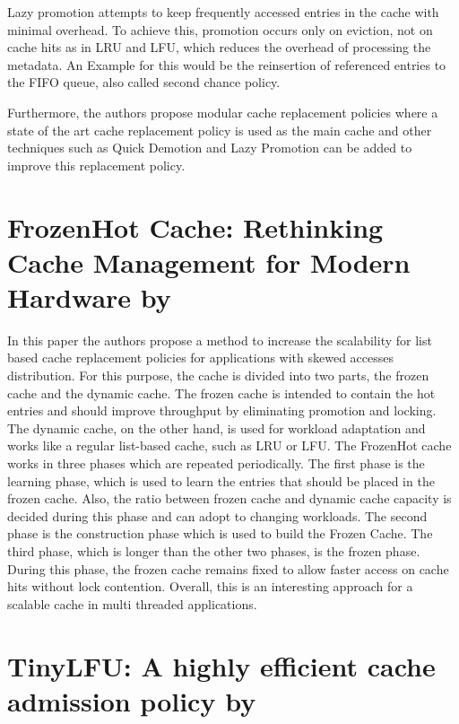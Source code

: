 \documentclass[
	12pt,
	a4paper,
	abstract,
	bibliography=totoc,
	chapterprefix,
	headings=openright,
	numbers=endperiod,
	parskip=half,
	twoside,
]{scrreprt}
\begin{document}
Lazy promotion attempts to keep frequently accessed entries in the cache with minimal overhead.
To achieve this, promotion occurs only on eviction, not on cache hits as in LRU and LFU, 
which reduces the overhead of processing the metadata.
An Example for this would be the reinsertion of referenced entries to the FIFO queue,
also called second chance policy.

Furthermore, the authors propose modular cache replacement policies where a state of the art cache replacement 
policy is used as the main cache and  other techniques such as Quick Demotion and Lazy Promotion 
can be added to improve this replacement policy.

\section*{FrozenHot Cache: Rethinking Cache Management for Modern Hardware by \cite{qiu2023frozenhot}}

In this paper the authors propose a method to increase the 
scalability for list based cache replacement policies for applications with skewed accesses distribution.
For this purpose, the cache is divided into two parts, the frozen cache and the dynamic cache.
The frozen cache is intended to contain the hot entries and should improve throughput by eliminating promotion and locking.
The dynamic cache, on the other hand, is used for workload adaptation 
and works like a regular list-based cache, such as LRU or LFU.
The FrozenHot cache works in three phases which are repeated periodically.
The first phase is the learning phase, which is used to learn the entries that should be placed in the frozen cache.
Also, the ratio between frozen cache and dynamic cache capacity is decided during this phase and 
can adopt to changing workloads.
The second phase is the construction phase which is used to build the Frozen Cache.
The third phase, which is longer than the other two phases, is the frozen phase.
During this phase, the frozen cache remains fixed to allow faster access on cache hits without lock contention.
Overall, this is an interesting approach for a scalable cache in multi threaded applications.


\section*{TinyLFU: A highly efficient cache admission policy by \cite{einziger2017tinylfu}}
\end{document}
